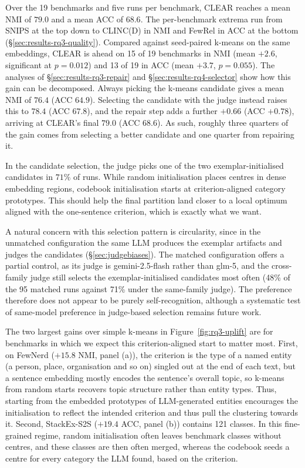 \documentclass[11pt,a4paper,oneside]{report}
\begin{document}
Over the 19 benchmarks and five runs per benchmark, CLEAR reaches a mean NMI of $79.0$ and a mean ACC of $68.6$. The per-benchmark extrema run from SNIPS at the top down to CLINC(D) in NMI and FewRel in ACC at the bottom (\S\ref{sec:results-rq3-quality}). Compared against seed-paired k-means on the same embeddings, CLEAR is
ahead on 15 of 19 benchmarks in NMI (mean $+2.6$, significant at $p = 0.012$) and 13 of 19 in ACC
(mean $+3.7$, $p = 0.055$). The analyses of \S\ref{sec:results-rq3-repair} and
\S\ref{sec:results-rq4-selector} show how this gain can be decomposed. Always picking the k-means candidate gives a mean NMI of $76.4$ (ACC
$64.9$). Selecting the candidate with the judge instead raises this to
$78.4$ (ACC $67.8$), and the repair step adds a further $+0.66$ (ACC
$+0.78$), arriving at CLEAR's final $79.0$ (ACC $68.6$). As such, roughly three quarters of the gain comes from selecting a better candidate and one
quarter from repairing it.

In the candidate selection, the judge picks one of the two
exemplar-initialised candidates in $71\%$ of runs. While random initialisation places centres in dense embedding regions, codebook initialisation starts at criterion-aligned category prototypes. This should help the final partition land closer to a local optimum aligned with the one-sentence criterion, which is exactly what we want.

A natural concern with this selection pattern is circularity, since in the unmatched configuration the same LLM produces the exemplar artifacts and judges the candidates (\S\ref{sec:judgebiases}). The matched configuration offers a partial control, as its judge is {\small\ttfamily gemini-2.5-flash} rather than {\small\ttfamily glm-5}, and the cross-family judge still selects the exemplar-initialised candidates most often (48\% of the 95 matched runs against 71\% under the same-family judge). The preference therefore does not appear to be purely self-recognition, although a systematic test of same-model preference in judge-based selection remains future work.

The two largest gains over simple k-means in Figure~\ref{fig:rq3-uplift} are for benchmarks in which we expect this criterion-aligned start to matter most. First, on FewNerd ($+15.8$ NMI, panel (a)), the criterion is the type of a named entity (a
person, place, organisation and so on) singled out at the end of each
text, but a sentence embedding mostly encodes the sentence's overall
topic, so k-means from random starts recovers topic structure rather
than entity types. Thus, starting from the embedded prototypes of LLM-generated entities encourages the initialisation to reflect the intended criterion and thus pull the clustering towards it. Second, StackEx-S2S ($+19.4$ ACC, panel (b)) contains 121 classes. In this fine-grained regime, random initialisation often leaves benchmark classes without centres, and these classes are then often merged, whereas the codebook seeds a centre for every category the LLM found, based on the criterion.
\end{document}
